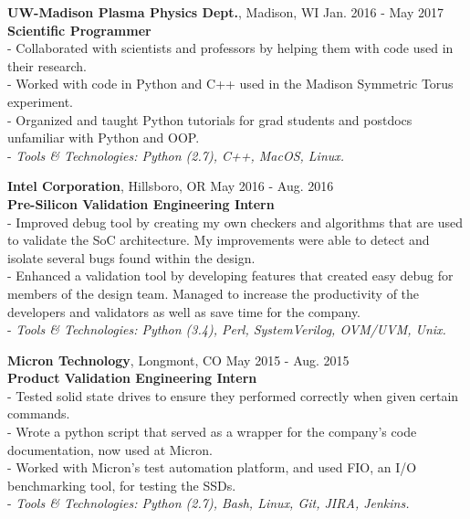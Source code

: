 \documentclass{resume}
\begin{document}
\begin{flushleft}
\textbf{UW-Madison Plasma Physics Dept.}, Madison, WI \hfill Jan. 2016 - May 2017 \\
\textbf{Scientific Programmer}\\
{\footnotesize
	\ttab- Collaborated with scientists and professors by helping them with code used in their research. \\
	\ttab- Worked with code in Python and C++ used in the Madison Symmetric Torus experiment. \\
	\ttab- Organized and taught Python tutorials for grad students and postdocs unfamiliar with Python and OOP. \\
	\ttab- \textit{Tools \& Technologies: Python (2.7), C++,  MacOS, Linux.}\\[5mm]
}

\textbf{Intel Corporation}, Hillsboro, OR \hfill May 2016 - Aug. 2016\\
\textbf{Pre-Silicon Validation Engineering Intern}\\
{\footnotesize
\ttab- Improved debug tool by creating my own checkers and algorithms that are used to validate the SoC architecture. My \ttab improvements were able to detect and isolate several bugs found within the design.\\
\ttab- Enhanced a validation tool by developing features that created easy debug for members of the design team. Managed to \ttab increase the productivity of the developers and validators as well as save time for the company. \\
\ttab- \textit{Tools \& Technologies: Python (3.4), Perl, SystemVerilog, OVM/UVM, Unix.}\\[3mm]
}

\textbf{Micron Technology}, Longmont, CO \hfill May 2015 - Aug. 2015\\
\textbf{Product Validation Engineering Intern}\\
{\footnotesize
\ttab- Tested solid state drives to ensure they performed correctly when given certain commands.\\
\ttab- Wrote a python script that served as a wrapper for the company's code documentation, now used at Micron.\\
\ttab- Worked with Micron's test automation platform, and used FIO, an I/O benchmarking tool, for testing the SSDs.\\
\ttab- \textit{Tools \& Technologies: Python (2.7), Bash, Linux, Git, JIRA, Jenkins.}\\[3mm]
}



\end{flushleft}
\end{document}
